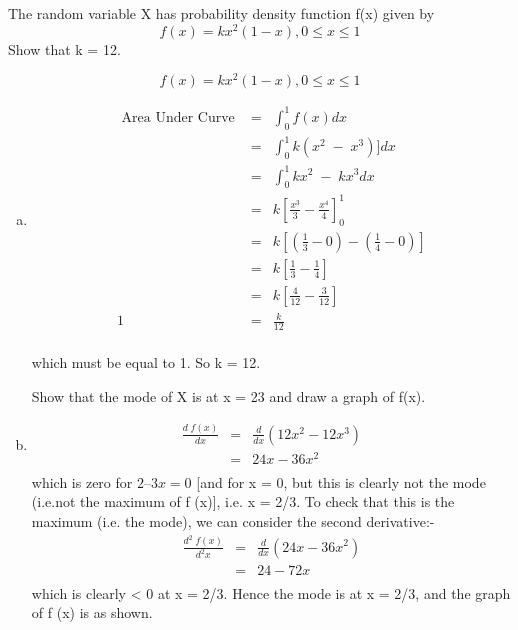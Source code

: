 \documentclass[a4paper,12pt]{article}
\begin{document}
\begin{framed}
The random variable X has probability density function f(x) given by
\[f(x) = kx^2 (1- x) , 0 \leq x \leq 1 \]
Show that k = 12.

\end{framed}

\[f(x) = kx^2 (1− x) , 0 \leq x \leq 1 \]
\begin{enumerate}[(a)]
\item 
\begin{eqnarray*}
\mbox{ Area Under Curve } &=& \int^{1}_{0} f(x) dx \\
&=& \int^{1}_{0} k(x^2\;-\;x^3)] dx \\
&=& \int^{1}_{0} kx^2\;-\;kx^3 dx \\
&=& k \left[ \frac{x^3}{3} - \frac{x^4}{4}\right]^1_0\\
&=& k \left[ \left( \frac{1}{3}- 0 \right) - \left( \frac{1}{4}- 0 \right)  \right]\\
&=& k \left[  \frac{1}{3} - \frac{1}{4} \right]\\
&=& k \left[  \frac{4}{12} - \frac{3}{12} \right]\\
1 &=&  \frac{k}{12} \\
\end{eqnarray*}

which must be equal to 1. So k = 12.
\newpage
\begin{framed}
 Show that the mode of X is at x = 23
and draw a graph of f(x).
\end{framed}

\item  
\begin{eqnarray*}
\frac{d\;f(x)}{dx} &=& \frac{d}{dx}\left( 12x^2-12x^3 \right)\\
&=&  24x-36x^2 \\
\end{eqnarray*}
which is zero for $2 – 3x = 0$ [and for x = 0, but this is clearly not the mode (i.e.not the maximum of f (x)], i.e. x = 2/3. To check that this is the maximum (i.e.                                                                                                                                                         the mode), we can consider the second derivative:-
\begin{eqnarray*}
\frac{d^2\;f(x)}{d^2x} &=& \frac{d}{dx}\left( 24x-36x^2 \right)\\
&=&  24-72x \\
\end{eqnarray*}
which is clearly < 0 at x = 2/3.
Hence the mode is at x = 2/3, and the graph of f (x) is as shown. 


\end{enumerate}
\end{document}
